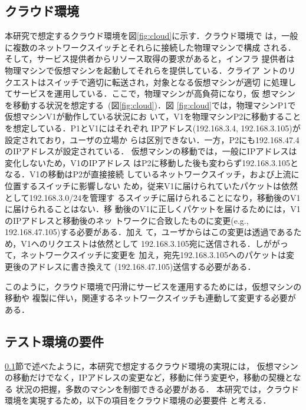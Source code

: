 \documentclass[submit,techrep]{ipsj}
\begin{document}
\subsection{クラウド環境}\label{subsec:cloud}
本研究で想定するクラウド環境を図\ref{fig:cloud}に示す．クラウド環境で
は，一般に複数のネットワークスイッチとそれらに接続した物理マシンで構成
される．そして，サービス提供者からリソース取得の要求があると，インフラ
提供者は物理マシンで仮想マシンを起動してそれらを提供している．クライア
ントのリクエストはスイッチで適切に転送され，対象となる仮想マシンが適切
に処理してサービスを運用している．ここで，物理マシンが高負荷になり，仮
想マシンを移動する状況を想定する~(図\ref{fig:cloud})．図
\ref{fig:cloud}では，物理マシンP1で仮想マシンV1が動作している状況にお
いて，V1を物理マシンP2に移動することを想定している．P1とV1にはそれぞれ
IPアドレス(192.168.3.4, 192.168.3.105)が設定されており，ユーザの立場か
らは区別できない．一方，P2にも192.168.47.4のIPアドレスが設定されている．
仮想マシンの移動では，一般にIPアドレスは変化しないため，V1のIPアドレス
はP2に移動した後も変わらず192.168.3.105となる．V1の移動はP2が直接接続
しているネットワークスイッチ，および上流に位置するスイッチに影響しない
ため，従来V1に届けられていたパケットは依然として192.168.3.0/24を管理す
るスイッチに届けられることになり，移動後のV1に届けられることはない．移
動後のV1に正しくパケットを届けるためには，V1のIPアドレスと移動後のネッ
トワークに合致したものに変更(e.g., 192.168.47.105)する必要がある．加え
て，ユーザからはこの変更は透過であるため，V1へのリクエストは依然として
192.168.3.105宛に送信される．しががって，ネットワークスイッチに変更を
加え，宛先192.168.3.105へのパケットは変更後のアドレスに書き換えて
(192.168.47.105)送信する必要がある．

このように，クラウド環境で円滑にサービスを運用するためには，仮想マシンの移動や
複製に伴い，関連するネットワークスイッチも連動して変更する必要がある．

\subsection{テスト環境の要件}\label{subsec:requirement}
\ref{subsec:cloud}節で述べたように，本研究で想定するクラウド環境の実現には，
仮想マシンの移動だけでなく，IPアドレスの変更など，移動に伴う変更や，移動の契機となる
状況の把握，多数のマシンを制御できる必要がある．
本研究では，クラウド環境を実現するため，以下の項目をクラウド環境の必要要件
と考える．
\end{document}
